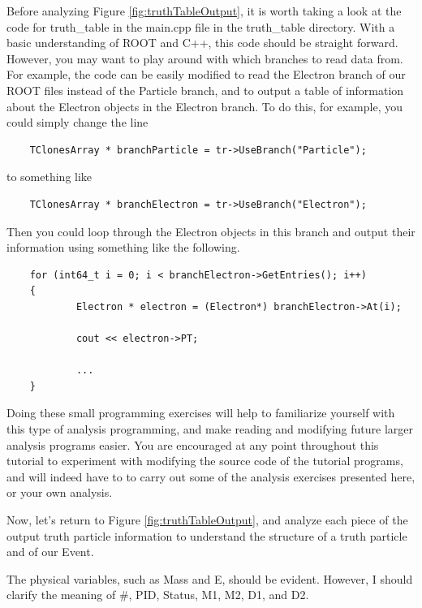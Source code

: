 \documentclass{article}
\begin{document}
\bigskip

Before analyzing Figure \ref{fig:truthTableOutput}, it is worth taking a look at the code for truth\_table in the main.cpp file in the truth\_table directory. With a basic understanding of ROOT and C++, this code should be straight forward. However, you may want to play around with which branches to read data from. For example, the code can be easily modified to read the Electron branch of our ROOT files instead of the Particle branch, and to output a table of information about the Electron objects in the Electron branch. To do this, for example, you could simply change the line

\begin{verbatim}
	TClonesArray * branchParticle = tr->UseBranch("Particle");
\end{verbatim}

to something like

\begin{verbatim}
	TClonesArray * branchElectron = tr->UseBranch("Electron");
\end{verbatim}

Then you could loop through the Electron objects in this branch and output their information using something like the following.

\begin{verbatim}
	for (int64_t i = 0; i < branchElectron->GetEntries(); i++)
	{
	        Electron * electron = (Electron*) branchElectron->At(i);

	        cout << electron->PT;

	        ...
	}
\end{verbatim}

Doing these small programming exercises will help to familiarize yourself with this type of analysis programming, and make reading and modifying future larger analysis programs easier. You are encouraged at any point throughout this tutorial to experiment with modifying the source code of the tutorial programs, and will indeed have to to carry out some of the analysis exercises presented here, or your own analysis.

\bigskip

Now, let's return to Figure \ref{fig:truthTableOutput}, and analyze each piece of the output truth particle information to understand the structure of a truth particle and of our Event.

\bigskip

The physical variables, such as Mass and E, should be evident. However, I should clarify the meaning of \#, PID, Status, M1, M2, D1, and D2.
\end{document}
